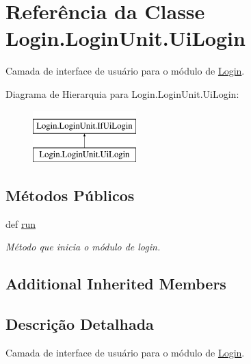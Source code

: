 \hypertarget{classLogin_1_1LoginUnit_1_1UiLogin}{\section{Referência da Classe Login.\-Login\-Unit.\-Ui\-Login}
\label{classLogin_1_1LoginUnit_1_1UiLogin}
}


Camada de interface de usuário para o módulo de \hyperlink{namespaceLogin}{Login}.  


Diagrama de Hierarquia para Login.\-Login\-Unit.\-Ui\-Login\-:\begin{figure}[H]
\begin{center}
\leavevmode
\includegraphics[height=2.000000cm]{de/da8/classLogin_1_1LoginUnit_1_1UiLogin}
\end{center}
\end{figure}
\subsection*{Métodos Públicos}
\begin{DoxyCompactItemize}
\item 
def \hyperlink{classLogin_1_1LoginUnit_1_1UiLogin_a9cd61a78d5ab0d201051ccf5898f86bc}{run}
\begin{DoxyCompactList}\small\item\em Método que inicia o módulo de login. \end{DoxyCompactList}\end{DoxyCompactItemize}
\subsection*{Additional Inherited Members}


\subsection{Descrição Detalhada}
Camada de interface de usuário para o módulo de \hyperlink{namespaceLogin}{Login}. 



